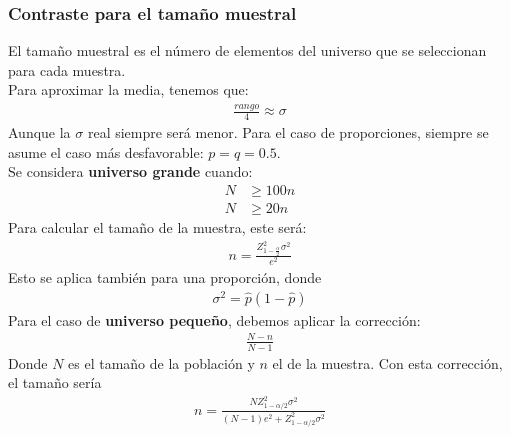 \documentclass{article}
\begin{document}
\subsubsection{Contraste para el tamaño muestral}
El tamaño muestral es el número de elementos del universo que se seleccionan para cada muestra.\\
Para aproximar la media, tenemos que:
\begin{equation}
    \begin{split}
        \frac{rango}{4} \approx \sigma 
    \end{split}
\end{equation}
Aunque la $\sigma $ real siempre será menor. Para el caso de proporciones, siempre se asume el caso más
desfavorable: $p=q=0.5$.\\
Se considera \textbf{universo grande} cuando:
\begin{equation}
    \begin{split}
        N &\geq 100n\\
        N &\geq 20n
    \end{split}
\end{equation}
Para calcular el tamaño de la muestra, este será:
\begin{equation}
    \begin{split}
        \boxed{n = \frac{Z^{2}_{1-\frac{\alpha}{2} }\sigma^{2}}{e^{2}}}
    \end{split}
\end{equation}
Esto se aplica también para una proporción, donde
\begin{equation}
    \begin{split}
        \sigma^{2} = \hat{p}(1-\hat{p})
    \end{split}
\end{equation}
Para el caso de \textbf{universo pequeño}, debemos aplicar la corrección:
\begin{equation}
    \begin{split}
        \frac{N-n}{N-1}
    \end{split}
\end{equation}
Donde $N$ es el tamaño de la población y $n$ el de la muestra. Con esta corrección, el tamaño
sería
\begin{equation}
    \begin{split}
        \boxed{n = \frac{N Z^{2}_{1-\alpha /2} \sigma^{2}}{(N-1)e^{2}+Z^{2}_{1-\alpha /2}\sigma^{2}}}
    \end{split}
\end{equation}
\end{document}
